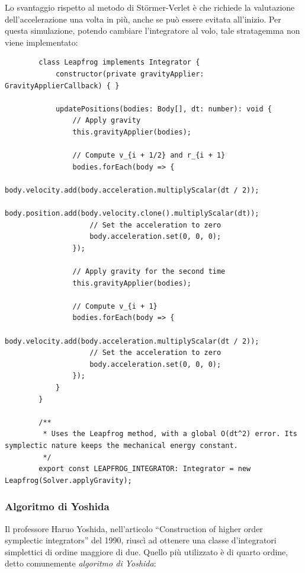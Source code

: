 \documentclass[11pt]{article}
\begin{document}
	Lo svantaggio rispetto al metodo di Störmer-Verlet è che richiede la valutazione dell'accelerazione una volta in più, anche se può essere evitata all'inizio. Per questa simulazione, potendo cambiare l'integratore al volo, tale stratagemma non viene implementato:

	\begin{verbatim}
		class Leapfrog implements Integrator {
			constructor(private gravityApplier: GravityApplierCallback) { }

			updatePositions(bodies: Body[], dt: number): void {
				// Apply gravity
				this.gravityApplier(bodies);

				// Compute v_{i + 1/2} and r_{i + 1}
				bodies.forEach(body => {
					body.velocity.add(body.acceleration.multiplyScalar(dt / 2));
					body.position.add(body.velocity.clone().multiplyScalar(dt));
					// Set the acceleration to zero
					body.acceleration.set(0, 0, 0);
				});

				// Apply gravity for the second time
				this.gravityApplier(bodies);

				// Compute v_{i + 1}
				bodies.forEach(body => {
					body.velocity.add(body.acceleration.multiplyScalar(dt / 2));
					// Set the acceleration to zero
					body.acceleration.set(0, 0, 0);
				});
			}
		}

		/**
		 * Uses the Leapfrog method, with a global O(dt^2) error. Its symplectic nature keeps the mechanical energy constant.
		 */
		export const LEAPFROG_INTEGRATOR: Integrator = new Leapfrog(Solver.applyGravity);
	\end{verbatim}

	\subsubsection{Algoritmo di Yoshida}

	Il professore Haruo Yoshida, nell'articolo ``Construction of higher order symplectic integrators'' del 1990\cite{Yoshida}, riuscì ad ottenere una classe d'integratori simplettici di ordine maggiore di due. Quello più utilizzato è di quarto ordine, detto comunemente \emph{algoritmo di Yoshida}:
\end{document}
